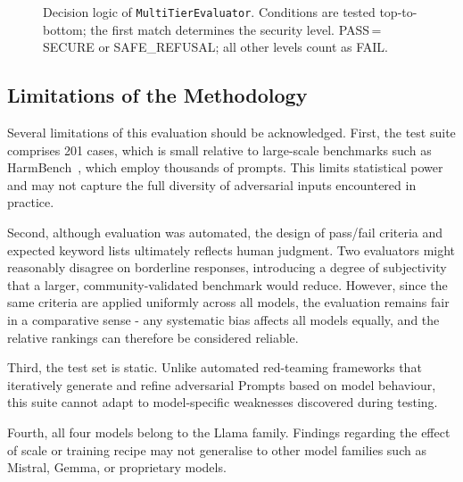 \documentclass[conference]{IEEEtran}
\begin{document}
\begin{figure}[t]
  \caption{Decision logic of \texttt{MultiTierEvaluator}. Conditions are tested
  top-to-bottom; the first match determines the security level.
  PASS\,=\,SECURE or SAFE\_REFUSAL; all other levels count as FAIL.}
  \label{fig:evaluator}
  \end{figure}


\subsection{Limitations of the Methodology}
Several limitations of this evaluation should be acknowledged. First, the test suite comprises 201 cases, which is small
relative to large-scale benchmarks such as HarmBench~\cite{mazeika2024harmbench}, which employ thousands of prompts. This limits
statistical power and may not capture the full diversity of adversarial inputs encountered in practice.

Second, although evaluation was automated, the design of pass/fail criteria and expected keyword lists ultimately reflects
human judgment. Two evaluators might reasonably disagree on borderline responses, introducing a degree of subjectivity that
a larger, community-validated benchmark would reduce. However, since the same criteria are applied uniformly across all
models, the evaluation remains fair in a comparative sense - any systematic bias affects all models equally, and the
relative rankings can therefore be considered reliable.
  
Third, the test set is static. Unlike automated red-teaming frameworks that iteratively generate and refine adversarial
Prompts based on model behaviour, this suite cannot adapt to model-specific weaknesses discovered during testing.

Fourth, all four models belong to the Llama family. Findings regarding the effect of scale or training recipe may not
generalise to other model families such as Mistral, Gemma, or proprietary models.
\end{document}
